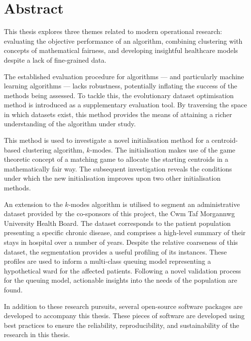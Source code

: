 \chapter*{Abstract}

This thesis explores three themes related to modern operational research:
evaluating the objective performance of an algorithm, combining clustering with
concepts of mathematical fairness, and developing insightful healthcare models
despite a lack of fine-grained data.

The established evaluation procedure for algorithms --- and particularly machine
learning algorithms --- lacks robustness, potentially inflating the success of
the methods being assessed. To tackle this, the evolutionary dataset
optimisation method is introduced as a supplementary evaluation tool. By
traversing the space in which datasets exist, this method provides the means of
attaining a richer understanding of the algorithm under study.

This method is used to investigate a novel initialisation method for a
centroid-based clustering algorithm, \(k\)-modes. The initialisation makes use
of the game theoretic concept of a matching game to allocate the starting
centroids in a mathematically fair way. The subsequent investigation reveals the
conditions under which the new initialisation improves upon two other
initialisation methods.

An extension to the \(k\)-modes algorithm is utilised to segment an
administrative dataset provided by the co-sponsors of this project, the Cwm Taf
Morgannwg University Health Board. The dataset corresponds to the patient
population presenting a specific chronic disease, and comprises a high-level
summary of their stays in hospital over a number of years. Despite the relative
coarseness of this dataset, the segmentation provides a useful profiling of its
instances. These profiles are used to inform a multi-class queuing model
representing a hypothetical ward for the affected patients. Following a novel
validation process for the queuing model, actionable insights into the needs of
the population are found.

In addition to these research pursuits, several open-source software packages
are developed to accompany this thesis. These pieces of software are developed
using best practices to ensure the reliability, reproducibility, and
sustainability of the research in this thesis.
